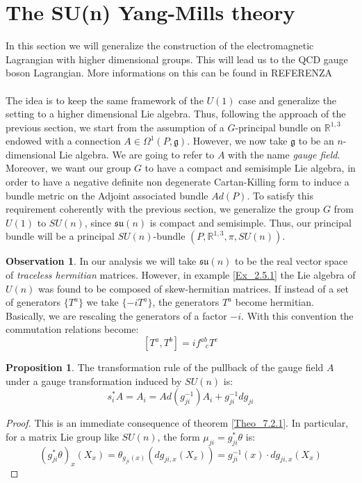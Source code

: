 \documentclass[12pt,a4paper]{report}
\theoremstyle{definition}
\theoremstyle{Theorem}
\newtheorem{Prop}[Def]{Proposition}
\theoremstyle{definition}
\theoremstyle{definition}
\newtheorem{Obs}[Def]{Observation}
\begin{document}
	\section{The SU(n) Yang-Mills theory}
	In this section we will generalize the construction of the electromagnetic Lagrangian with higher dimensional groups. This will lead us to the QCD gauge boson Lagrangian. More informations on this can be found in REFERENZA\\
	\\
	The idea is to keep the same framework of the $U(1)$ case and generalize the setting to a higher dimensional Lie algebra. Thus, following the approach of the previous section, we start from the assumption of a $G$-principal bundle on $\mathbb{R}^{1,3}$ endowed with a connection $A\in \Omega^1(P,\mathfrak{g})$. However, we now take $\mathfrak{g}$ to be an $n$-dimensional Lie algebra. We are going to refer to $A$ with the name \textit{gauge field}. Moreover, we want our group $G$ to have a compact and semisimple Lie algebra, in order to have a negative definite non degenerate Cartan-Killing form to induce a bundle metric on the Adjoint associated bundle $Ad(P)$. To satisfy this requirement coherently with the previous section, we generalize the group $G$ from $U(1)$ to $SU(n)$, since $\mathfrak{su}(n)$ is compact and semisimple. Thus, our principal bundle will be a principal $SU(n)$-bundle $(P,\mathbb{R}^{1,3},\pi,SU(n))$.
	\begin{Obs}
		In our analysis we will take $\mathfrak{su}(n)$ to be the real vector space of \textit{traceless hermitian} matrices. However, in example \ref{Ex_2.5.1} the Lie algebra of $U(n)$ was found to be composed of skew-hermitian matrices. If instead of a set of generators $\{T^a\}$ we take $\{-iT^a\}$, the generators $T^a$ become hermitian. Basically, we are rescaling the generators of a factor $-i$.
		With this convention the commutation relations become:
		$$[T^a,T^b]=if^{ab}_{\hspace{9pt}c}T^c$$
	\end{Obs}
	\begin{Prop}
		The transformation rule of the pullback of the gauge field $A$ under a gauge transformation induced by $SU(n)$ is:
		$$s_i^*A=A_i=Ad(g_{ji}^{-1})A_i+g^{-1}_{ji}dg_{ji}$$ 
	\end{Prop}
	\begin{proof}
		This is an immediate consequence of theorem \ref{Theo_7.2.1}. In particular, for a matrix Lie group like $SU(n)$, the form $\mu_{ji}=g_{ji}^*\theta$ is:
		$$(g_{ji}^*\theta)_x(X_x)=\theta_{g_{ji}(x)}(dg_{ji,x}(X_x))=g^{-1}_{ji}(x)\cdot dg_{ji,x}(X_x)$$
	\end{proof}
\end{document}
